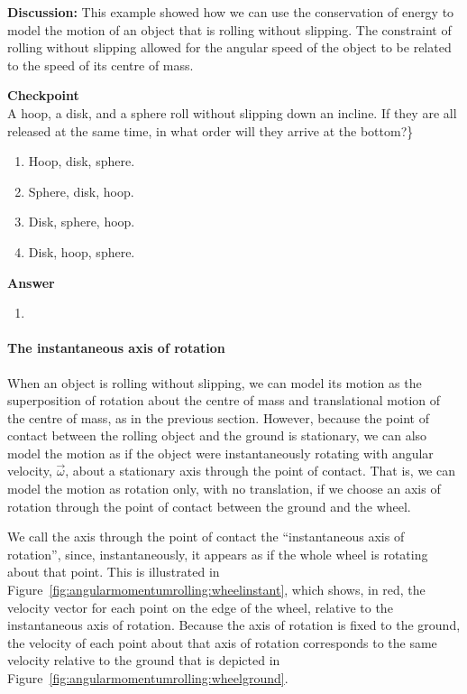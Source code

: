 \begin{framed}
\begin{framed}
\textbf{Discussion:} This example showed how we can use the conservation of energy to model the motion of an object that is rolling without slipping. The constraint of rolling without slipping allowed for the angular speed of the object to be related to the speed of its centre of mass.
\end{framed}
\end{framed}

\begin{framed}
\textbf{Checkpoint}\\
A hoop, a disk, and a sphere roll without slipping down an incline. If they are all released at the same time, in what order will they arrive at the bottom?\}

\begin{enumerate}
\item Hoop, disk, sphere.
\item Sphere, disk, hoop.
\item Disk, sphere, hoop.
\item Disk, hoop, sphere.
\end{enumerate}

\begin{framed}
\textbf{Answer}\\
\begin{enumerate}[resume]
\item
\end{enumerate}
\end{framed}
\end{framed}

\paragraph{The instantaneous axis of rotation}

When an object is rolling without slipping, we can model its motion as the superposition of rotation about the centre of mass and translational motion of the centre of mass, as in the previous section. However, because the point of contact between the rolling object and the ground is stationary, we can also model the motion as if the object were instantaneously rotating with angular velocity, $\vec \omega$, about a stationary axis through the point of contact. That is, we can model the motion as rotation only, with no translation, if we choose an axis of rotation through the point of contact between the ground and the wheel.

We call the axis through the point of contact the ``instantaneous axis of rotation'', since, instantaneously, it appears as if the whole wheel is rotating about that point. This is illustrated in Figure~\ref{fig:angularmomentumrolling:wheelinstant}, which shows, in red, the velocity vector for each point on the edge of the wheel, relative to the instantaneous axis of rotation. Because the axis of rotation is fixed to the ground, the velocity of each point about that axis of rotation corresponds to the same velocity relative to the ground that is depicted in Figure~\ref{fig:angularmomentumrolling:wheelground}.

